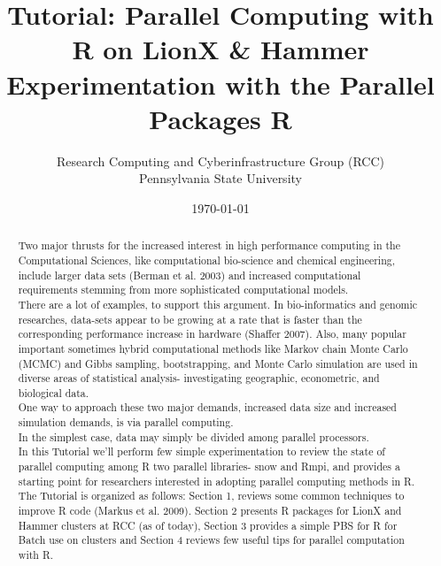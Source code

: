 \documentclass[12pt]{article}
\begin{document}
\title{Tutorial: Parallel Computing with R on LionX \& Hammer\\ Experimentation with the Parallel Packages R}
\author{
        Research Computing and Cyberinfrastructure Group (RCC)\\
        Pennsylvania State University\\        
            \and
        }
\date{\today}
\maketitle

\begin{abstract}
 
Two major thrusts for the increased interest in high performance computing in the Computational Sciences, like computational bio-science and chemical engineering, include larger data sets (Berman et al. 2003) and increased computational requirements stemming from more sophisticated computational models. \\

There are a lot of examples, to support this argument. In bio-informatics and genomic researches, data-sets appear to be growing at a rate that is faster than the corresponding performance increase in hardware (Shaffer 2007). Also, many popular important sometimes hybrid computational methods like Markov chain Monte Carlo (MCMC) and Gibbs sampling, bootstrapping, and Monte Carlo simulation are used in diverse areas of statistical analysis- investigating  geographic, econometric, and biological data.\\
One way to approach these two major demands, increased data size and increased simulation demands,  is via parallel computing. \\
In the simplest case, data may simply be divided among parallel processors. \\
 In this Tutorial we'll perform few simple experimentation to review the state of parallel computing among R two parallel libraries- snow and Rmpi, and provides a starting point for researchers interested in adopting parallel computing methods in R. The Tutorial is organized as follows: Section 1, reviews some common techniques to improve R code (Markus et al. 2009). Section 2 presents R packages for LionX and Hammer clusters at RCC (as of today), Section 3 provides a simple PBS for R for Batch use on clusters and Section 4 reviews few useful tips for parallel computation with R.
\end{abstract}
\end{document}
